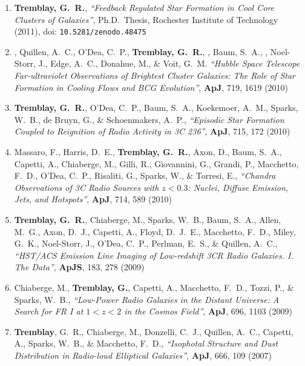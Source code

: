 \documentclass[11pt]{article}
\begin{document}
\begin{enumerate}
\item {\bf Tremblay, G.~R.}, {\it ``Feedback Regulated Star Formation in Cool Core 
Clusters of Galaxies''}, Ph.D.~Thesis, Rochester Institute of Technology (2011), {\sc doi}: \texttt{10.5281/zenodo.48475}



\item {}, Quillen, A.~C., O'Dea, C.~P., {\bf Tremblay, G.~R.}, , Baum, S.~A., , Noel-Storr, J., Edge, A.~C., Donahue, 
M., \& Voit, G.~M.  {\it ``Hubble Space Telescope Far-ultraviolet Observations of Brightest Cluster Galaxies: The Role of Star Formation in Cooling Flows and BCG Evolution''}, \textbf{ApJ}, 719,  1619 (2010)



\item {\bf Tremblay, G.~R.}, O'Dea, C.~P., Baum, S.~A., Koekemoer, A.~M., Sparks, 
W.~B., de Bruyn, G., 
\& Schoenmakers, A.~P.,  {\it ``Episodic Star Formation Coupled to Reignition of Radio Activity in 3C 236''}, \textbf{ApJ}, 715,  172 (2010)




\item Massaro, F.,  Harris, D.~E., {\bf Tremblay, G.~R.}, Axon, D., 
Baum, S.~A., Capetti, A., Chiaberge, M., Gilli, R., 
Giovannini, G., Grandi, P., Macchetto, F.~D., O'Dea, C.~P., Risaliti, G., 
Sparks, W., 
\& Torresi, E., {\it ``Chandra Observations of 3C Radio Sources with $z < 0.3$: Nuclei, Diffuse Emission, Jets, and Hotspots''}, \textbf{ApJ}, 714,  589 (2010)




\item {\bf Tremblay, G.~R.}, Chiaberge, M., Sparks, W.~B., Baum, S.~A., Allen, 
M.~G., Axon, D.~J., Capetti, A., Floyd, D.~J.~E., Macchetto, F.~D., Miley, 
G.~K., Noel-Storr, J., O'Dea, C.~P., Perlman, E.~S., 
\& Quillen, A.~C.,  {\it ``HST/ACS Emission Line Imaging of Low-redshift 3CR Radio Galaxies. I. The Data''}, \textbf{ApJS}, 183,  278 (2009)



\item Chiaberge, M., {\bf Tremblay, G.}, Capetti, A., Macchetto, F.~D., Tozzi, P., 
\& Sparks, W.~B.,  {\it ``Low-Power Radio Galaxies in the Distant Universe: A Search for FR I at $1< z < 2$ in the Cosmos Field''}, \textbf{ApJ}, 696,  1103 (2009)



\item {\bf Tremblay}, G.~R., Chiaberge, M., Donzelli, C.~J., Quillen, A.~C., 
Capetti, A., Sparks, W.~B., 
\& Macchetto, F.~D., {\it ``Isophotal Structure and Dust Distribution in Radio-loud Elliptical Galaxies''}, \textbf{ApJ}, 666,  109 (2007)


\end{enumerate}
\end{document}
